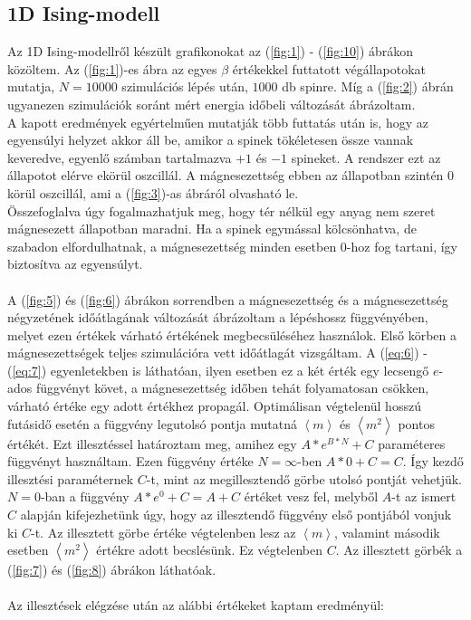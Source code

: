 \subsection{1D Ising-modell}
Az 1D Ising-modellről készült grafikonokat az (\ref{fig:1}) - (\ref{fig:10}) ábrákon közöltem. Az (\ref{fig:1})-es ábra az egyes $\beta$ értékekkel futtatott végállapotokat mutatja, $N = 10000$ szimulációs lépés után, $1000$ db spinre. Míg a (\ref{fig:2}) ábrán ugyanezen szimulációk soránt mért energia időbeli változását ábrázoltam. \\
A kapott eredmények egyértelműen mutatják több futtatás után is, hogy az egyensúlyi helyzet akkor áll be, amikor a spinek tökéletesen össze vannak keveredve, egyenlő számban tartalmazva $+1$ és $-1$ spineket. A rendszer ezt az állapotot elérve ekörül oszcillál. A mágnesezettség ebben az állapotban szintén $0$ körül oszcillál, ami a (\ref{fig:3})-as ábráról olvasható le. \\
Összefoglalva úgy fogalmazhatjuk meg, hogy tér nélkül egy anyag nem szeret mágnesezett állapotban maradni. Ha a spinek egymással kölcsönhatva, de szabadon elfordulhatnak, a mágnesezettség minden esetben $0$-hoz fog tartani, így biztosítva az egyensúlyt.
\\ \\
A (\ref{fig:5}) és (\ref{fig:6}) ábrákon sorrendben a mágnesezettség és a mágnesezettség négyzetének időátlagának változását ábrázoltam a lépéshossz függvényében, melyet ezen értékek várható értékének megbecsüléséhez használok. Első körben a mágnesezettségek teljes szimulációra vett időátlagát vizsgáltam. A (\ref{eq:6}) - (\ref{eq:7}) egyenletekben is láthatóan, ilyen esetben ez a két érték egy lecsengő $e$-ados függvényt követ, a mágnesezettség időben tehát folyamatosan csökken, várható értéke egy adott értékhez propagál. Optimálisan végtelenül hosszú futásidő esetén a függvény legutolsó pontja mutatná $\left< m \right>$ és $\left< m^{2} \right>$ pontos értékét. Ezt illesztéssel határoztam meg, amihez egy $A * e^{B * N} + C$ paraméteres függvényt használtam. Ezen függvény értéke $N = \infty$-ben $A * 0 + C = C$. Így kezdő illesztési paraméternek $C$-t, mint az megillesztendő görbe utolsó pontját vehetjük. $N = 0$-ban a függvény $A * e^{0} + C = A + C$ értéket vesz fel, melyből $A$-t az ismert $C$ alapján kifejezhetünk úgy, hogy az illesztendő függvény első pontjából vonjuk ki $C$-t. Az illesztett görbe értéke végtelenben lesz az $\left< m \right>$, valamint második esetben $\left< m^{2} \right>$ értékre adott becslésünk. Ez végtelenben $C$. Az illesztett görbék a (\ref{fig:7}) és (\ref{fig:8}) ábrákon láthatóak.
\\ \\
Az illesztések elégzése után az alábbi értékeket kaptam eredményül:

